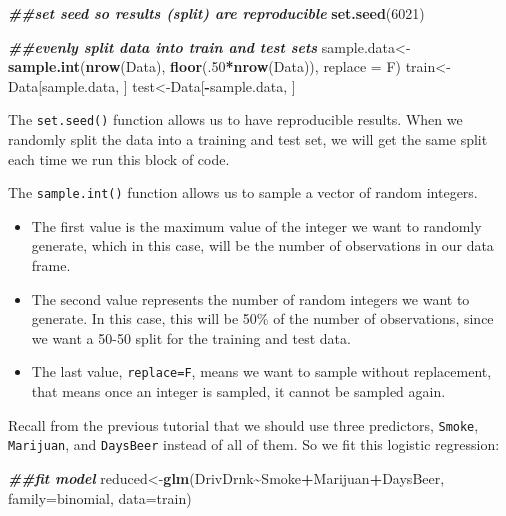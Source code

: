 \documentclass[
]{book}
\newenvironment{Shaded}{\begin{snugshade}}{\end{snugshade}}
\newcommand{\AttributeTok}[1]{\textcolor[rgb]{0.13,0.29,0.53}{#1}}
\newcommand{\DecValTok}[1]{\textcolor[rgb]{0.00,0.00,0.81}{#1}}
\newcommand{\DocumentationTok}[1]{\textcolor[rgb]{0.56,0.35,0.01}{\textbf{\textit{#1}}}}
\newcommand{\FunctionTok}[1]{\textcolor[rgb]{0.13,0.29,0.53}{\textbf{#1}}}
\newcommand{\NormalTok}[1]{#1}
\newcommand{\OtherTok}[1]{\textcolor[rgb]{0.56,0.35,0.01}{#1}}
\newcommand{\SpecialCharTok}[1]{\textcolor[rgb]{0.81,0.36,0.00}{\textbf{#1}}}
\providecommand{\tightlist}{%
  \setlength{\itemsep}{0pt}\setlength{\parskip}{0pt}}
\begin{document}
\begin{Shaded}
\begin{Highlighting}[]
\DocumentationTok{\#\#set seed so results (split) are reproducible}
\FunctionTok{set.seed}\NormalTok{(}\DecValTok{6021}\NormalTok{)}

\DocumentationTok{\#\#evenly split data into train and test sets}
\NormalTok{sample.data}\OtherTok{\textless{}{-}}\FunctionTok{sample.int}\NormalTok{(}\FunctionTok{nrow}\NormalTok{(Data), }\FunctionTok{floor}\NormalTok{(.}\DecValTok{50}\SpecialCharTok{*}\FunctionTok{nrow}\NormalTok{(Data)), }\AttributeTok{replace =}\NormalTok{ F)}
\NormalTok{train}\OtherTok{\textless{}{-}}\NormalTok{Data[sample.data, ]}
\NormalTok{test}\OtherTok{\textless{}{-}}\NormalTok{Data[}\SpecialCharTok{{-}}\NormalTok{sample.data, ]}
\end{Highlighting}
\end{Shaded}

The \texttt{set.seed()} function allows us to have reproducible results. When we randomly split the data into a training and test set, we will get the same split each time we run this block of code.

The \texttt{sample.int()} function allows us to sample a vector of random integers.

\begin{itemize}
\tightlist
\item
  The first value is the maximum value of the integer we want to randomly generate, which in this case, will be the number of observations in our data frame.
\item
  The second value represents the number of random integers we want to generate. In this case, this will be 50\% of the number of observations, since we want a 50-50 split for the training and test data.
\item
  The last value, \texttt{replace=F}, means we want to sample without replacement, that means once an integer is sampled, it cannot be sampled again.
\end{itemize}

Recall from the previous tutorial that we should use three predictors, \texttt{Smoke}, \texttt{Marijuan}, and \texttt{DaysBeer} instead of all of them. So we fit this logistic regression:

\begin{Shaded}
\begin{Highlighting}[]
\DocumentationTok{\#\#fit model}
\NormalTok{reduced}\OtherTok{\textless{}{-}}\FunctionTok{glm}\NormalTok{(DrivDrnk}\SpecialCharTok{\textasciitilde{}}\NormalTok{Smoke}\SpecialCharTok{+}\NormalTok{Marijuan}\SpecialCharTok{+}\NormalTok{DaysBeer, }\AttributeTok{family=}\NormalTok{binomial, }\AttributeTok{data=}\NormalTok{train)}
\end{Highlighting}
\end{Shaded}
\end{document}
